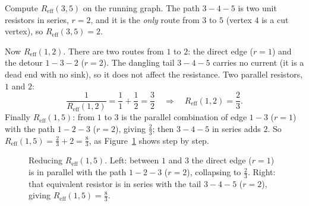 \begin{example}\label{ch35:ex-reff}
Compute $R_{\mathrm{eff}}(3,5)$ on the running graph. The path $3\!-\!4\!-\!5$ is two unit resistors in series, $r=2$, and it is the \emph{only} route from $3$ to $5$ (vertex $4$ is a cut vertex), so $R_{\mathrm{eff}}(3,5)=2$.

Now $R_{\mathrm{eff}}(1,2)$. There are two routes from $1$ to $2$: the direct edge ($r=1$) and the detour $1\!-\!3\!-\!2$ ($r=2$). The dangling tail $3\!-\!4\!-\!5$ carries no current (it is a dead end with no sink), so it does not affect the resistance. Two parallel resistors, $1$ and $2$:
\[
  \frac{1}{R_{\mathrm{eff}}(1,2)}=\frac11+\frac12=\frac32
  \quad\Longrightarrow\quad
  R_{\mathrm{eff}}(1,2)=\frac23.
\]
Finally $R_{\mathrm{eff}}(1,5)$: from $1$ to $3$ is the parallel combination of edge $1\!-\!3$ ($r=1$) with the path $1\!-\!2\!-\!3$ ($r=2$), giving $\frac23$; then $3\!-\!4\!-\!5$ in series adds $2$. So $R_{\mathrm{eff}}(1,5)=\frac23+2=\frac83$, as Figure~\ref{ch35:fig-reduce} shows step by step.

\begin{figure}[H]
\centering
{}
\caption{Reducing $R_{\mathrm{eff}}(1,5)$. Left: between $1$ and $3$ the direct edge ($r{=}1$) is in parallel with the path $1\!-\!2\!-\!3$ ($r{=}2$), collapsing to $\tfrac23$. Right: that equivalent resistor is in series with the tail $3\!-\!4\!-\!5$ ($r{=}2$), giving $R_{\mathrm{eff}}(1,5)=\tfrac83$.}
\label{ch35:fig-reduce}
\end{figure}
\end{example}


